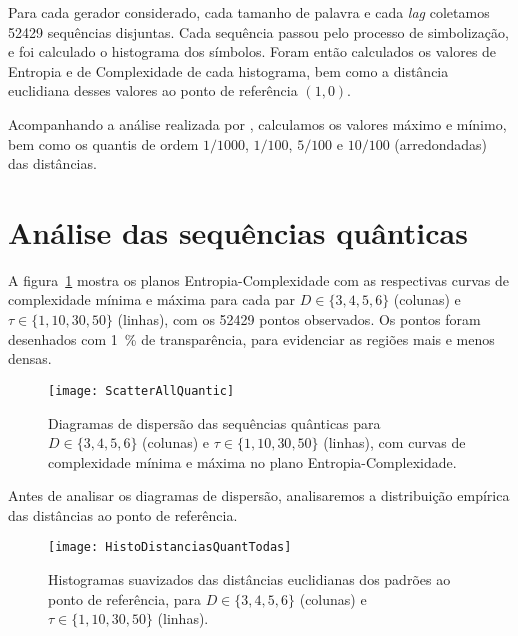 

\begin{center}
\end{center}

Para cada gerador considerado, cada tamanho de palavra e cada \textit{lag} coletamos \num{52429} sequências disjuntas.
Cada sequência passou pelo processo de simbolização, e foi calculado o histograma dos símbolos.
Foram então calculados os valores de Entropia e de Complexidade de cada histograma, bem como a distância euclidiana desses valores ao ponto de referência $(1,0)$.

Acompanhando a análise realizada por \citet{NewPermutationEntropy}, calculamos os valores máximo e mínimo, bem como os quantis de ordem $1/1000$, $1/100$, $5/100$ e $10/100$ (arredondadas) das distâncias.

\section{Análise das sequências quânticas}

A figura~\ref{Fig:ScatterAllQuantic} mostra os planos Entropia-Complexidade com as respectivas curvas de complexidade mínima e máxima para cada par $D\in\{3,4,5,6\}$ (colunas) e $\tau\in\{1,10,30,50\}$ (linhas), com os \num{52429} pontos observados.
Os pontos foram desenhados com \SI{1}{\percent} de transparência, para evidenciar as regiões mais e menos densas.

\begin{figure}[hbt]
\centering
\texttt{[image: ScatterAllQuantic]}
\caption{Diagramas de dispersão das sequências quânticas para $D\in\{3,4,5,6\}$ (colunas) e $\tau\in\{1,10,30,50\}$ (linhas), com curvas de complexidade mínima e máxima no plano Entropia-Complexidade.}\label{Fig:ScatterAllQuantic}
\end{figure}

Antes de analisar os diagramas de dispersão, analisaremos a distribuição empírica das distâncias ao ponto de referência.

\begin{figure}[hbt]
\centering
\texttt{[image: HistoDistanciasQuantTodas]}
\caption{Histogramas suavizados das distâncias euclidianas dos padrões ao ponto de referência, para $D\in\{3,4,5,6\}$ (colunas) e $\tau\in\{1,10,30,50\}$ (linhas).}\label{Fig:HistoDistanciasQuantTodas}
\end{figure}

